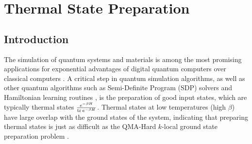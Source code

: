 \newcommand{\partrace}[2]{\Tr_{#1} \brackets{ #2 }}
\newcommand{\complex}{\mathbb{C}}
\newcommand{\hilb}{\mathcal{H}}
\newcommand{\partfun}{\mathcal{Z}}
\newcommand{\identity}{\mathds{1}}
\newcommand{\gue}{\rm GUE}
\newcommand{\herm}[1]{\hermMathOp\parens{#1}}
\newcommand{\on}{\rm on}
\newcommand{\off}{\rm off}
\newcommand{\haar}{\text{Haar}}
\newcommand{\EE}{\mathbb{E}}
\newcommand{\TT}{\mathcal{T}}

\chapter{Thermal State Preparation} \label{ch:tsp}

\section{Introduction}

The simulation of quantum systems and materials is among the most promising applications for exponential advantages of digital quantum computers over classical computers \cite{aspuru2005simulated} \cite{reiher2017elucidating} \cite{tensorHypercontraction}. A critical step in quantum simulation algorithms, as well as other quantum algorithms such as Semi-Definite Program (SDP) solvers \cite{brandao2019sdp} and Hamiltonian learning routines \cite{anshu_sample-efficient_2021}, is the preparation of good input states, which are typically thermal states $\frac{e^{-\beta H}}{\trace{e^{-\beta H}}}$. Thermal states at low temperatures (high $\beta$) have large overlap with the ground states of the system, indicating that preparing thermal states is just as difficult as the QMA-Hard $k$-local ground state preparation problem \cite{kempe2005complexitylocalhamiltonianproblem}. 

